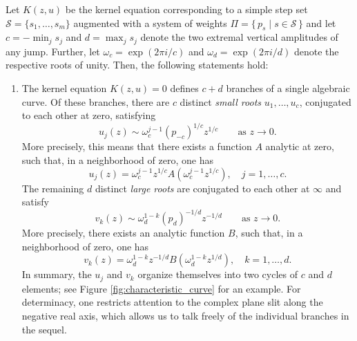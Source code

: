 \begin{proposition} \label{prop:kernel_method}
  Let $K(z,u)$ be the kernel equation corresponding to a simple step set $\mathcal{S} = \{s_1, \dots, s_m\}$ augmented with a system of weights $\Pi = \{\, p_s \mid s \in \mathcal{S} \,\}$ and let $c = - \min_j s_j$ and $d = \max_j s_j$ denote the two extremal vertical amplitudes of any jump.
  Further, let $\omega_c = \exp\left(2 \pi i/c\right)$ and $\omega_d = \exp\left(2 \pi i / d\right)$ denote the respective roots of unity. 
  Then, the following statements hold:
  \begin{enumerate}
    \item The kernel equation $K(z,u) = 0$ defines $c + d$ branches of a single algebraic curve. Of these branches, there are $c$ distinct \textit{small roots} $u_1, \dots, u_c$, conjugated to each other at zero, satisfying
    \begin{equation*}\label{eq:small_roots_expansion}
      u_j(z) \sim \omega_c^{j-1}(p_{-c})^{1/c}z^{1/c} \qquad \text{as $z \to 0$.}
    \end{equation*}
    More precisely, this means that there exists a function $A$ analytic at zero, such that, in a neighborhood of zero, one has
    \begin{equation*}
        u_j(z) = \omega_c^{j-1} z^{1/c} 
        A\left(
          \omega_c^{j-1}z^{1/c}
        \right) , \quad j = 1, \dots, c.
    \end{equation*}
    The remaining $d$ distinct \textit{large roots} are conjugated to each other at $\infty$ and satisfy
    \begin{equation*}
      v_k(z) \sim \omega_d^{1-k}(p_d)^{-1/d}z^{-1/d} \qquad \text{as $z \to 0$.}
    \end{equation*}
    More precisely, there exists an analytic function $B$, such that, in a neighborhood of zero, one has
    \begin{equation*}
        v_k(z) = \omega_d^{1-k}z^{-1/d} 
        B\left(
          \omega_d^{1-k}z^{1/d}
        \right), \quad k = 1, \dots, d.
    \end{equation*}
    In summary, the $u_j$ and $v_k$ organize themselves into two cycles of $c$ and $d$ elements; see Figure \ref{fig:characteristic_curve} for an example.
    For determinacy, one restricts attention to the complex plane slit along the negative real axis, which allows us to talk freely of the individual branches in the sequel.

\end{enumerate}
\end{proposition}
